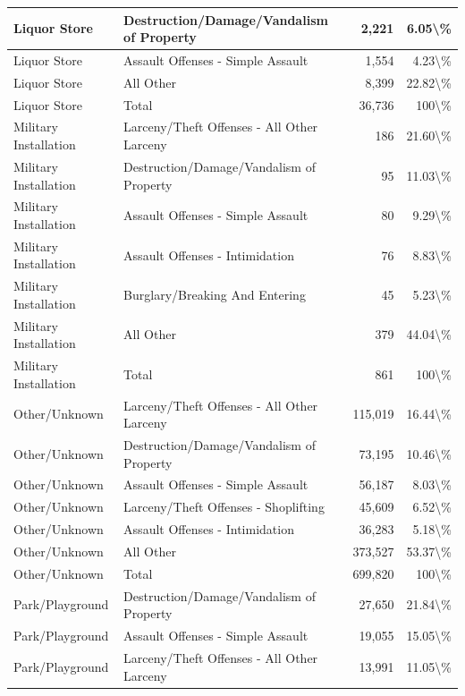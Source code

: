 \documentclass[
]{krantz}
\begin{document}
\begin{longtable}[t]{l|l|r|r}
\hline
Liquor Store & Destruction/Damage/Vandalism of Property & 2,221 & 6.05\textbackslash{}\%\\
\hline
Liquor Store & Assault Offenses - Simple Assault & 1,554 & 4.23\textbackslash{}\%\\
\hline
Liquor Store & All Other & 8,399 & 22.82\textbackslash{}\%\\
\hline
Liquor Store & Total & 36,736 & 100\textbackslash{}\%\\
\hline
Military Installation & Larceny/Theft Offenses - All Other Larceny & 186 & 21.60\textbackslash{}\%\\
\hline
Military Installation & Destruction/Damage/Vandalism of Property & 95 & 11.03\textbackslash{}\%\\
\hline
Military Installation & Assault Offenses - Simple Assault & 80 & 9.29\textbackslash{}\%\\
\hline
Military Installation & Assault Offenses - Intimidation & 76 & 8.83\textbackslash{}\%\\
\hline
Military Installation & Burglary/Breaking And Entering & 45 & 5.23\textbackslash{}\%\\
\hline
Military Installation & All Other & 379 & 44.04\textbackslash{}\%\\
\hline
Military Installation & Total & 861 & 100\textbackslash{}\%\\
\hline
Other/Unknown & Larceny/Theft Offenses - All Other Larceny & 115,019 & 16.44\textbackslash{}\%\\
\hline
Other/Unknown & Destruction/Damage/Vandalism of Property & 73,195 & 10.46\textbackslash{}\%\\
\hline
Other/Unknown & Assault Offenses - Simple Assault & 56,187 & 8.03\textbackslash{}\%\\
\hline
Other/Unknown & Larceny/Theft Offenses - Shoplifting & 45,609 & 6.52\textbackslash{}\%\\
\hline
Other/Unknown & Assault Offenses - Intimidation & 36,283 & 5.18\textbackslash{}\%\\
\hline
Other/Unknown & All Other & 373,527 & 53.37\textbackslash{}\%\\
\hline
Other/Unknown & Total & 699,820 & 100\textbackslash{}\%\\
\hline
Park/Playground & Destruction/Damage/Vandalism of Property & 27,650 & 21.84\textbackslash{}\%\\
\hline
Park/Playground & Assault Offenses - Simple Assault & 19,055 & 15.05\textbackslash{}\%\\
\hline
Park/Playground & Larceny/Theft Offenses - All Other Larceny & 13,991 & 11.05\textbackslash{}\%\\

\end{longtable}
\end{document}
